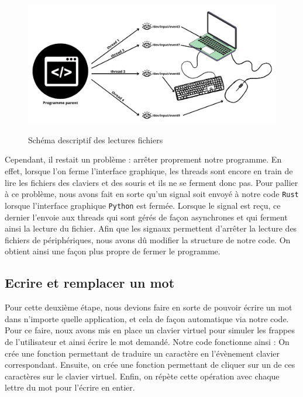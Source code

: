 \documentclass[a4paper, 11pt]{report}
\newcommand{\langage}[1]{\texttt{#1}}
\begin{document}
{\begin{figure}[H]
	\begin{center}
		{\includegraphics[width=\textwidth]{images/lecture-fichier.png}}
	\end{center}
	\caption{Schéma descriptif des lectures fichiers}
	\label{fig:lecture_fichier}
\end{figure}

Cependant, il restait un problème : arrêter proprement notre programme. En effet, lorsque l'on ferme l'interface graphique, les threads sont encore en train de lire les fichiers des claviers et des souris et ils ne se ferment donc pas. Pour pallier à ce problème, nous avons fait en sorte qu'un signal soit envoyé à notre code \langage{Rust} lorsque l'interface graphique \langage{Python} est fermée. Lorsque le signal est reçu, ce dernier l'envoie aux threads qui sont gérés de façon asynchrones et qui ferment ainsi la lecture du fichier. Afin que les signaux permettent d'arrêter la lecture des fichiers de périphériques, nous avons dû modifier la structure de notre code. On obtient ainsi une façon plus propre de fermer le programme.

\subsection{Ecrire et remplacer un mot}

Pour cette deuxième étape, nous devions faire en sorte de pouvoir écrire un mot dans n'importe quelle application, et cela de façon automatique via notre code. Pour ce faire,  noux avons mis en place un clavier virtuel pour simuler les frappes de l'utilisateur et ainsi écrire le mot demandé. Notre code fonctionne ainsi : On crée une fonction permettant de traduire un caractère en l'évènement clavier correspondant. Ensuite, on crée une fonction permettant de cliquer sur un de ces caractères sur le clavier virtuel. Enfin, on répète cette opération avec chaque lettre du mot pour l'écrire en entier.\\

}
\end{document}
